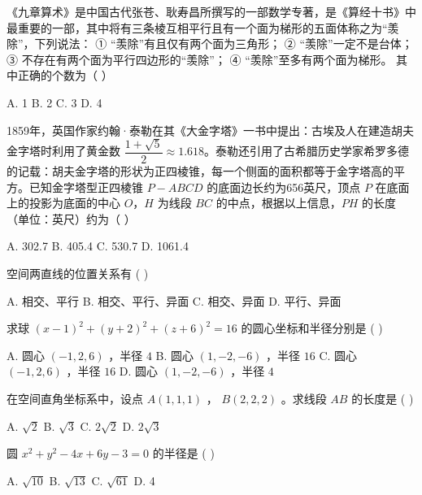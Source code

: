 \documentclass[11pt, a4paper]{article}
\begin{document}
\begin{baitap}[4]
《九章算术》是中国古代张苍、耿寿昌所撰写的一部数学专著，是《算经十书》中最重要的一部，其中将有三条棱互相平行且有一个面为梯形的五面体称之为“羡除”，下列说法： ① “羡除”有且仅有两个面为三角形； ② “羡除”一定不是台体； ③ 不存在有两个面为平行四边形的“羡除”； ④ “羡除”至多有两个面为梯形。 其中正确的个数为（ ）
\par\vspace{3pt}
\noindent A. 1 \quad B. 2 \quad C. 3 \quad D. 4
\end{baitap}

\begin{baitap}[5]
1859年，英国作家约翰·泰勒在其《大金字塔》一书中提出：古埃及人在建造胡夫金字塔时利用了黄金数 $\dfrac{1+\sqrt{5}}{2} \approx 1.618$。泰勒还引用了古希腊历史学家希罗多德的记载：胡夫金字塔的形状为正四棱锥，每一个侧面的面积都等于金字塔高的平方。已知金字塔型正四棱锥 $P-ABCD$ 的底面边长约为656英尺，顶点 $P$ 在底面上的投影为底面的中心 $O$，$H$ 为线段 $BC$ 的中点，根据以上信息，$PH$ 的长度（单位：英尺）约为（ ）
\par\vspace{3pt}
\noindent A. 302.7 \quad B. 405.4 \quad C. 530.7 \quad D. 1061.4
\end{baitap}

\begin{baitap}[6]
空间两直线的位置关系有 ( )
\par\vspace{3pt}
\noindent A. 相交、平行 \quad B. 相交、平行、异面 \quad C. 相交、异面 \quad D. 平行、异面
\end{baitap}

\begin{baitap}[7]
求球 $(x-1)^2 + (y+2)^2 + (z+6)^2 = 16$ 的圆心坐标和半径分别是 ( )
\par\vspace{3pt}
\noindent A. 圆心 $(-1,2,6)$ ，半径 $4$ \quad B. 圆心 $(1,-2,-6)$ ，半径 $16$ \quad C. 圆心 $(-1,2,6)$ ，半径 $16$ \quad D. 圆心 $(1,-2,-6)$ ，半径 $4$
\end{baitap}

\begin{baitap}[8]
在空间直角坐标系中，设点 $A(1,1,1)$ ， $B(2,2,2)$ 。求线段 $AB$ 的长度是 ( )
\par\vspace{3pt}
\noindent A. $\sqrt{2}$ \quad B. $\sqrt{3}$ \quad C. $2\sqrt{2}$ \quad D. $2\sqrt{3}$
\end{baitap}

\begin{baitap}[9]
圆 $x^2 + y^2 - 4x + 6y - 3 = 0$ 的半径是 ( )
\par\vspace{3pt}
\noindent A. $\sqrt{10}$ \quad B. $\sqrt{13}$ \quad C. $\sqrt{61}$ \quad D. 4
\end{baitap}
\end{document}
